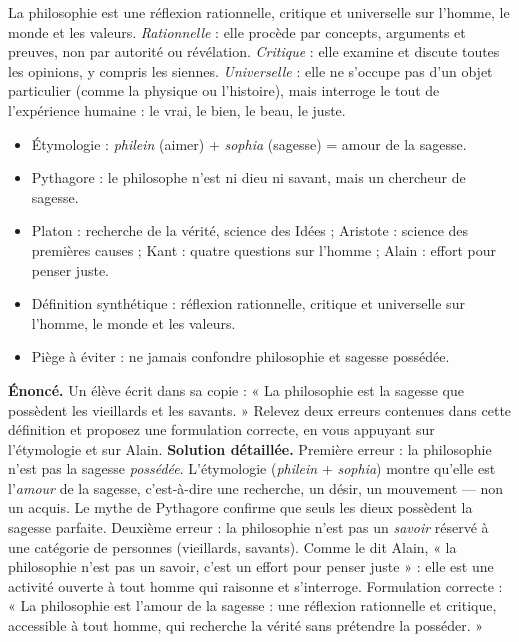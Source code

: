 \documentclass[11pt]{article}
\newcommand{\cle}[1]{{\popxbold\color{popdark}#1}}
\begin{document}
\begin{definition}
La philosophie est une \cle{réflexion rationnelle}, \cle{critique} et \cle{universelle} sur l'\cle{homme}, le \cle{monde} et les \cle{valeurs}. \emph{Rationnelle} : elle procède par concepts, arguments et preuves, non par autorité ou révélation. \emph{Critique} : elle examine et discute toutes les opinions, y compris les siennes. \emph{Universelle} : elle ne s'occupe pas d'un objet particulier (comme la physique ou l'histoire), mais interroge le tout de l'expérience humaine : le vrai, le bien, le beau, le juste.
\end{definition}

\begin{aretenir}
\begin{itemize}
\item Étymologie : \emph{philein} (aimer) + \emph{sophia} (sagesse) = amour de la sagesse.
\item Pythagore : le philosophe n'est ni dieu ni savant, mais un chercheur de sagesse.
\item Platon : recherche de la vérité, science des Idées ; Aristote : science des premières causes ; Kant : quatre questions sur l'homme ; Alain : effort pour penser juste.
\item Définition synthétique : réflexion rationnelle, critique et universelle sur l'homme, le monde et les valeurs.
\item Piège à éviter : ne jamais confondre philosophie et sagesse possédée.
\end{itemize}
\end{aretenir}

\begin{exoresolu}
\textbf{Énoncé.} Un élève écrit dans sa copie : « La philosophie est la sagesse que possèdent les vieillards et les savants. » Relevez deux erreurs contenues dans cette définition et proposez une formulation correcte, en vous appuyant sur l'étymologie et sur Alain.
\tcblower
\textbf{Solution détaillée.} Première erreur : la philosophie n'est pas la sagesse \emph{possédée}. L'étymologie (\emph{philein} + \emph{sophia}) montre qu'elle est l'\emph{amour} de la sagesse, c'est-à-dire une recherche, un désir, un mouvement — non un acquis. Le mythe de Pythagore confirme que seuls les dieux possèdent la sagesse parfaite. Deuxième erreur : la philosophie n'est pas un \emph{savoir} réservé à une catégorie de personnes (vieillards, savants). Comme le dit Alain, « la philosophie n'est pas un savoir, c'est un effort pour penser juste » : elle est une activité ouverte à tout homme qui raisonne et s'interroge. Formulation correcte : « La philosophie est l'amour de la sagesse : une réflexion rationnelle et critique, accessible à tout homme, qui recherche la vérité sans prétendre la posséder. »
\end{exoresolu}
\end{document}
